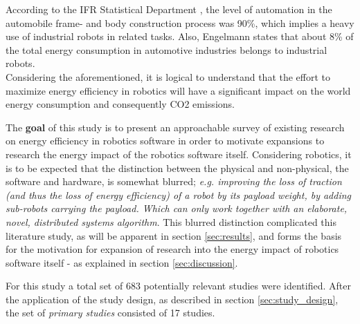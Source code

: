 According to the IFR Statistical Department \cite{IFR2010executive_summary}, the level of automation in the automobile frame- and body construction process was 90\%, which implies a heavy use of industrial robots in related tasks. 
Also, Engelmann \cite{engelmann2009energy_efficient_factories} states that about 8\% of the total energy consumption in automotive industries belongs to industrial robots. \\

Considering the aforementioned, it is logical to understand that the effort to maximize energy efficiency in robotics will have a significant impact on the world energy consumption and consequently CO2 emissions.

The \textbf{goal} of this study is to present an approachable survey of existing research on energy efficiency in robotics software in order to motivate expansions to research the energy impact of the robotics software itself.
Considering robotics, it is to be expected that the distinction between the physical and non-physical, the software and hardware, is somewhat blurred; \textit{e.g. improving the loss of traction (and thus the loss of energy efficiency) of a robot by its payload weight, by adding sub-robots carrying the payload. 
Which can only work together with an elaborate, novel, distributed systems algorithm}.
This blurred distinction complicated this literature study, as will be apparent in section \ref{sec:results}, and forms the basis for the motivation for expansion of research into the energy impact of robotics software itself - as explained in section \ref{sec:discussion}.

For this study a total set of 683 potentially relevant studies were identified. After the application of the study design, as described in section \ref{sec:study_design}, the set of \textit{primary studies} consisted of 17 studies.